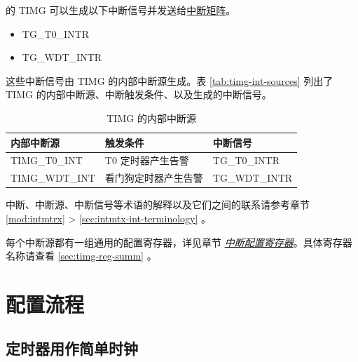 \documentclass[main\_\_CN.tex]{subfiles}
\begin{document}
\chipname{} 的 TIMG 可以生成以下中断信号并发送给\hyperref[mod:intmtrx]{中断矩阵}。

    \begin{itemize}
        \item TG\_T0\_INTR
        \item TG\_WDT\_INTR
    \end{itemize}

这些中断信号由 TIMG 的内部中断源生成。表 \ref{tab:timg-int-sources} 列出了 TIMG 的内部中断源、中断触发条件、以及生成的中断信号。

\begin{longtable}{ | L{5cm} | L{6.5cm} | L{4cm} | }
\caption{TIMG 的内部中断源}
\label{tab:timg-int-sources}
\\ \hline
{}
\textbf{内部中断源} & \textbf{触发条件}  &  \textbf{中断信号}\\ \hline
\label{int:TIMGT0INT}TIMG\_T0\_INT  &  T0 定时器产生告警 &  TG\_T0\_INTR  \\ \hline
\label{int:TIMGWDTINT}TIMG\_WDT\_INT &  看门狗定时器产生告警 & TG\_WDT\_INTR \\ \hline
\end{longtable}

\begin{tiplisting}
中断、中断源、中断信号等术语的解释以及它们之间的联系请参考章节 \ref{mod:intmtrx} \textit{} > \ref{sec:intmtx-int-terminology} \textit{}。
\end{tiplisting}

每个中断源都有一组通用的配置寄存器，详见章节 \hyperref[interrupt-config-registers]{\textit{中断配置寄存器}}。具体寄存器名称请查看 \ref{sec:timg-reg-summ} \textit{}。


\section{配置流程}

\subsection{定时器用作简单时钟}
\label{sec:timg-func-descr-simple-clock}
\end{document}
